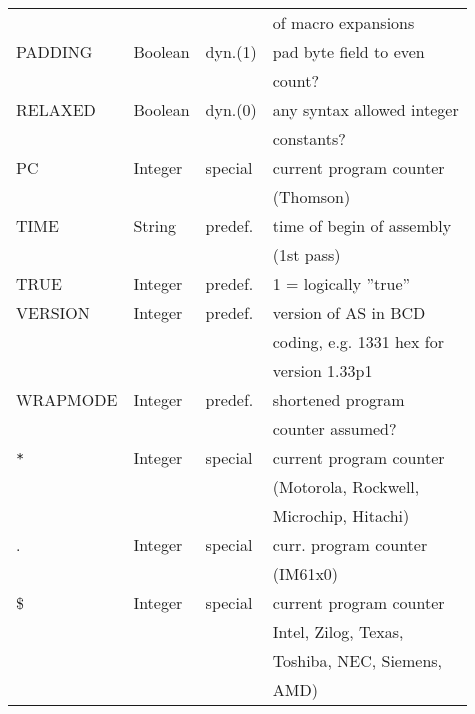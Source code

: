 \documentclass[12pt,twoside]{report}
\newcommand{\asname}{{AS}}
\begin{document}
\begin{center}
\begin{longtable}{|l|l|l|l|}
              &           &            & of macro expansions \\
PADDING       & Boolean   & dyn.(1)    & pad byte field to even \\
              &           &            & count? \\
RELAXED       & Boolean   & dyn.(0)    & any syntax allowed integer \\
              &           &            & constants? \\
PC            & Integer   & special    & current program counter \\
              &           &            & (Thomson) \\
TIME          & String    & predef.    & time of begin of assembly \\
              &           &            & (1st pass) \\
TRUE          & Integer   & predef.    & 1 = logically ''true'' \\
VERSION       & Integer   & predef.    & version of \asname{} in BCD \\
	      &  	  &	       & coding, e.g. 1331 hex for \\
              &           &            & version 1.33p1 \\
WRAPMODE      & Integer   & predef.    & shortened program \\
              &           &            & counter assumed? \\
\verb!*!      & Integer   & special    & current program counter \\
              &           &            & (Motorola, Rockwell, \\
              &           &            & Microchip, Hitachi) \\
.             & Integer   & special    & curr. program counter \\
              &           &            & (IM61x0) \\
\$            & Integer   & special    & current program counter \\
              &           &            & Intel, Zilog, Texas, \\
              &           &            & Toshiba, NEC, Siemens, \\
              &           &            & AMD) \\
\hline
\end{longtable}\end{center}
\end{document}
